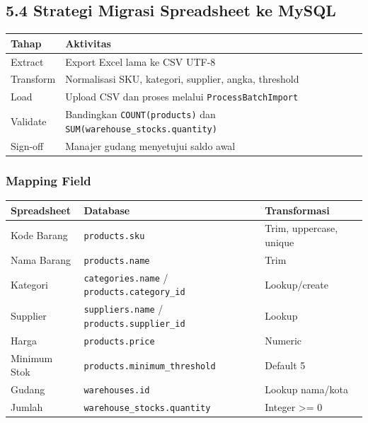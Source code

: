 \documentclass[
]{article}
\begin{document}
\subsection{5.4 Strategi Migrasi Spreadsheet ke
MySQL}\label{54-strategi-migrasi-spreadsheet-ke-mysql}

\begin{longtable}[]{@{}P{0.26\textwidth}P{0.70\textwidth}@{}}
\toprule\noalign{}
Tahap & Aktivitas \\
\midrule\noalign{}
\endhead
\bottomrule\noalign{}
\endlastfoot
Extract & Export Excel lama ke CSV UTF-8 \\
Transform & Normalisasi SKU, kategori, supplier, angka, threshold \\
Load & Upload CSV dan proses melalui \texttt{ProcessBatchImport} \\
Validate & Bandingkan \texttt{COUNT(products)} dan
\texttt{SUM(warehouse\_stocks.quantity)} \\
Sign-off & Manajer gudang menyetujui saldo awal \\
\end{longtable}

\subsubsection{Mapping Field}\label{mapping-field}

\begin{longtable}[]{@{}P{0.20\textwidth}P{0.26\textwidth}P{0.50\textwidth}@{}}
\toprule\noalign{}
Spreadsheet & Database & Transformasi \\
\midrule\noalign{}
\endhead
\bottomrule\noalign{}
\endlastfoot
Kode Barang & \texttt{products.sku} & Trim, uppercase, unique \\
Nama Barang & \texttt{products.name} & Trim \\
Kategori & \texttt{categories.name} / \texttt{products.category\_id} &
Lookup/create \\
Supplier & \texttt{suppliers.name} / \texttt{products.supplier\_id} &
Lookup \\
Harga & \texttt{products.\allowbreak price} & Numeric \\
Minimum Stok & \texttt{products.\allowbreak minimum\_threshold} & Default 5 \\
Gudang & \texttt{warehouses.id} & Lookup nama/kota \\
Jumlah & \texttt{warehouse\_stocks.quantity} & Integer \textgreater=
0 \\
\end{longtable}
\end{document}
